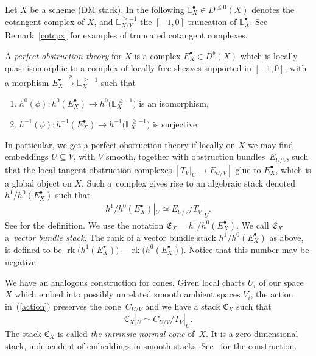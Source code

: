 \documentclass[pdftex]{sigma}
\numberwithin{equation}{section}
\newcommand{\E}{\mathfrak E}
\newcommand{\rk}{\operatorname{rk}}
\theoremstyle{plain}
\theoremstyle{definition}
\theoremstyle{remark}
\begin{document}
Let $X$ be a scheme (DM stack). In the following $\mathbb L^\bullet_{X}\in D^{\leq 0}(X)$ denotes the cotangent complex of $X$, and $\mathbb L^{\geq -1}_{X/Y}$ the $[-1,0]$ truncation of $\mathbb L^\bullet_{X}$. See Remark~\ref{cotcpx} for examples of truncated cotangent complexes.

\begin{Definition}\label{bfobs}
A \textit{perfect obstruction theory} for $X$ is a complex $E^{\bullet}_{X}\in D^{b}(X)$ which is locally quasi-isomorphic to a complex of locally free sheaves supported in $[-1, 0]$, with a morphism $E^{\bullet}_{X}\xrightarrow{\phi}\mathbb L^{\geq -1}_{X} $ such that
 \begin{enumerate}\itemsep=0pt
 \item[1)] $h^0(\phi)\colon h^0(E^{\bullet}_{X})\to h^0\big(\mathbb L^{\geq -1}_{X}\big)$ is an isomorphism,
 \item[2)] $h^{-1}(\phi)\colon h^{-1}(E^{\bullet}_{X})\to h^{-1}\big(\mathbb L^{\geq -1}_{X}\big)$ is surjective.
\end{enumerate}
 \end{Definition}
In particular, we get a perfect obstruction theory if locally on $X$ we may find embeddings $U\subseteq V$, with $V$ smooth, together with obstruction bundles~$E_{U/V}$, such that the local tangent-obstruction complexes $[T_V|_U\to E_{U/V}]$ glue to $E^{\bullet}_{X}$, which is a global object on $X$. Such a~complex gives rise to an algebraic stack denoted $h^1/h^0(E^{\bullet}_{X})$ such that \begin{gather*}h^1/h^0(E^{\bullet}_{X})|_U\simeq E_{U/V}/T_V|_U.\end{gather*} See \cite[Section~2]{BerFan} for the definition. We use the notation $\mathfrak{E}_X=h^1/h^0(E^{\bullet}_{X})$. We call $\E_X$ a~\emph{vector bundle stack}. The rank of a vector bundle stack $h^1/h^0(E^{\bullet}_{X})$ as above, is defined to be $\rk\big(h^1(E^{\bullet}_{X})\big)-\rk\big(h^0(E^{\bullet}_{X})\big)$. Notice that this number may be negative.

We have an analogous construction for cones. Given local charts $U_i$ of our space $X$ which embed into possibly unrelated smooth ambient spaces $V_i$, the action in~(\ref{action}) preserves the cone~$C_{U/V}$ and we have a stack $\mathfrak C_X$ such that
\[\mathfrak C_X|_U\simeq C_{U/V}/T_V|_U.
\]
The stack $\mathfrak C_X$ is called \emph{the intrinsic normal cone} of~$X$. It is a zero dimensional stack, independent of embeddings in smooth stacks. See~\cite{BerFan} for the construction.
\end{document}
